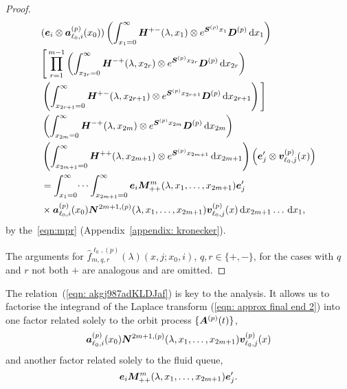 \begin{proof}
\begin{align}
	&(\bs e_i \otimes \bs   a_{\ell_0,i}^{(p)}(x_0)) \left( \int_{x_1=0}^\infty \bs H^{+-}(\lambda,x_1)\otimes e^{\bs{S}^{(p)}x_1}\bs{D}^{(p)}\wrt x_1 \right)\nonumber%
	\\&\Bigg[\prod_{r=1}^{m-1} \left(\int_{x_{2r}=0}^\infty \bs H^{-+}(\lambda,x_{2r}) \otimes e^{\bs{S}^{(p)}x_{2r}}\bs{D}^{(p)}\wrt x_{2r}\right) \nonumber 
	\\&\nonumber \left(\int_{x_{2r+1}=0}^\infty \bs H^{+-}(\lambda,x_{2r+1})
	\otimes e^{\bs{S}^{(p)}x_{2r+1}}\bs{D}^{(p)} \wrt x_{2r+1} \right)\Bigg] 
	\\&\left(\int_{x_{2m}=0}^\infty \bs H^{-+}(\lambda,x_{2m})
	  \otimes e^{\bs{S}^{(p)}x_{2m}}\bs{D}^{(p)} \wrt x_{2m} \right) \nonumber 
	\\&\left(\int_{x_{2m+1}=0}^\infty \bs H^{++}(\lambda,x_{2m+1})\otimes 
	e^{\bs{S}^{(p)}x_{2m+1}} \wrt x_{2m+1}\right) \left(\bs e_j\tr{} \otimes {\bs v}_{\ell_0,j}^{(p)}(x)\right) \nonumber
	\\&=\int_{x_1=0}^\infty \dots \int_{x_{2m+1}=0}^\infty \bs e_i\bs M^{m}_{++}(\lambda,x_1,\dots,x_{2m+1})\bs e_j\tr{} \nonumber 
	\\&\times \bs a_{\ell_0,i}^{(p)}(x_0) \bs N^{2m+1,(p)}(\lambda,x_1,\dots,x_{2m+1}) {\bs v}_{\ell_0,j}^{(p)}( x)\wrt x_{2m+1}\dots\wrt x_1 ,
	 \label{eqn: approx final end 2}
\end{align}
by the~\ref{eqn:mpr} (Appendix~\ref{appendix: kronecker}).

The arguments for \(\widehat f^{\ell_0,(p)}_{m,q,r}(\lambda)(x, j; x_0,i)\), \(q,r\in\{+,-\}\), for the cases with \(q\) and \(r\) not both \(+\) are analogous and are omitted. 
\end{proof}
The relation~(\ref{eqn: akgj987adKLDJaf}) is key to the analysis. It allows us to factorise the integrand of the Laplace transform (\ref{eqn: approx final end 2}) into one factor related solely to the orbit process \(\{\boldsymbol A^{(p)}(t)\}\), 
\[\boldsymbol a_{\ell_0,i}^{(p)}(x_0) \boldsymbol N^{2m+1,(p)}(\lambda,x_1,\dots,x_{2m+1}) {\boldsymbol v}_{\ell_0,j}^{(p)}( x)\] 
and another factor related solely to the fluid queue,
\[\boldsymbol e_i\boldsymbol M^{m}_{++}(\lambda,x_1,\dots,x_{2m+1})\boldsymbol e_j'{}.\] 

